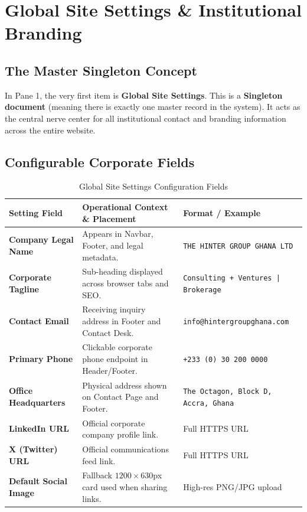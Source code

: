 \documentclass[11pt,a4paper,oneside]{book}
\begin{document}
\chapter{Global Site Settings \& Institutional Branding}
\label{chap:settings}

\section{The Master Singleton Concept}
In Pane 1, the very first item is \textbf{Global Site Settings}. This is a \textbf{Singleton document} (meaning there is exactly one master record in the system). It acts as the central nerve center for all institutional contact and branding information across the entire website.

\section{Configurable Corporate Fields}
\begin{table}[H]
\centering
\small
\begin{tabularx}{\textwidth}{lXl}
  \toprule
  \textbf{Setting Field} & \textbf{Operational Context \& Placement} & \textbf{Format / Example} \\
  \midrule
  \textbf{Company Legal Name} & Appears in Navbar, Footer, and legal metadata. & \texttt{THE HINTER GROUP GHANA LTD} \\
  \textbf{Corporate Tagline} & Sub-heading displayed across browser tabs and SEO. & \texttt{Consulting + Ventures | Brokerage} \\
  \textbf{Contact Email} & Receiving inquiry address in Footer and Contact Desk. & \texttt{info@hintergroupghana.com} \\
  \textbf{Primary Phone} & Clickable corporate phone endpoint in Header/Footer. & \texttt{+233 (0) 30 200 0000} \\
  \textbf{Office Headquarters} & Physical address shown on Contact Page and Footer. & \texttt{The Octagon, Block D, Accra, Ghana} \\
  \textbf{LinkedIn URL} & Official corporate company profile link. & Full HTTPS URL \\
  \textbf{X (Twitter) URL} & Official communications feed link. & Full HTTPS URL \\
  \textbf{Default Social Image} & Fallback $1200\times630$px card used when sharing links. & High-res PNG/JPG upload \\
  \bottomrule
\end{tabularx}
\caption{Global Site Settings Configuration Fields}
\label{tab:site_settings}
\end{table}
\end{document}
